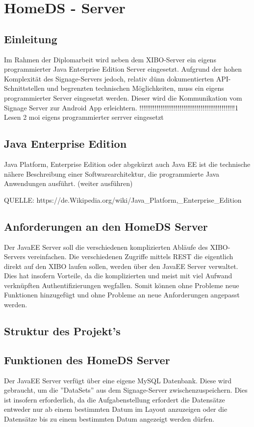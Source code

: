 \chapter{HomeDS - Server}
\section{Einleitung}\label{sec:einleitung}
Im Rahmen der Diplomarbeit wird neben dem XIBO-Server ein eigens programmierter Java Enterprise Edition Server eingesetzt. Aufgrund der hohen Komplexität des Signage-Servers jedoch, relativ dünn dokumentierten API-Schnittstellen und begrenzten technischen Möglichkeiten, muss ein eigens programmierter Server eingesetzt werden. Dieser wird die Kommunikation vom Signage Server zur Android App erleichtern.  
!!!!!!!!!!!!!!!!!!!!!!!!!!!!!!!!!!!!!!!!!!!!!!!!!!1 Lesen 2 moi eigens programmierter serrver eingesetzt


\section{Java Enterprise Edition}\label{sec:javaee}
Java Platform, Enterprise Edition oder abgekürzt auch Java EE ist die technische nähere Beschreibung einer Softwarearchitektur, die programmierte Java Anwendungen ausführt.
(weiter ausführen)

QUELLE: https://de.Wikipedia.org/wiki/Java_Platform,_Enterprise_Edition
 
\section{Anforderungen an den HomeDS Server}\label{sec:homeds}
Der JavaEE Server soll die verschiedenen komplizierten Abläufe des XIBO-Servers vereinfachen. Die verschiedenen Zugriffe mittels REST die eigentlich direkt auf den XIBO laufen sollen, werden über den JavaEE Server verwaltet. Dies hat insofern Vorteile, da die komplizierten und meist mit viel Aufwand verknüpften Authentifizierungen wegfallen. Somit können ohne Probleme neue Funktionen hinzugefügt und ohne Probleme an neue Anforderungen angepasst werden.

\section{Struktur des Projekt's}\label{sec:javaee}
 
\section{Funktionen des HomeDS Server}\label{sec:homedsfunction}
Der JavaEE Server verfügt über eine eigene MySQL Datenbank. Diese wird gebraucht, um die ''DataSets'' aus dem Signage-Server zwischenzuspeichern. Dies ist insofern erforderlich, da die Aufgabenstellung erfordert die Datensätze entweder nur ab einem bestimmten Datum im Layout anzuzeigen oder die Datensätze bis zu einem bestimmten Datum angezeigt werden dürfen. 
 
